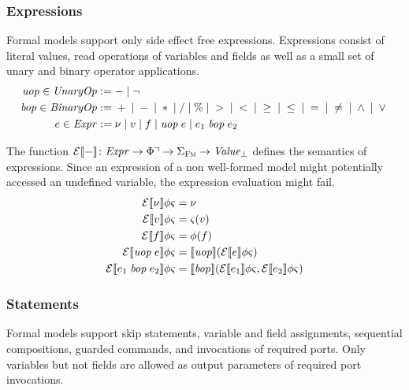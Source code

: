 \documentclass[a4paper,10pt,english]{article}
\begin{document}
\subsubsection{Expressions}
Formal models support only side effect free expressions. Expressions consist of literal values, read operations of variables
and fields as well as a small set of unary and binary operator applications.
\begin{align*}
	\mathit{uop} \in \mathit{UnaryOp} & := - \mid \neg
	\\
    \mathit{bop} \in \mathit{BinaryOp} & := {} + {} \mid {} - {} \mid {} \ast {} \mid {} / {}
                       \mid {} \% {} \mid {} > {} \mid {} < {} \mid {} \geq {} 
                       \mid {} \leq {} \mid {} = {} \mid {} \neq {} \mid {} \wedge {} \mid {} \vee {}
	\\
	e \in \mathit{Expr} & := 
		\nu \mid
		v \mid
		f \mid 
		\mathit{uop}\; e \mid
		e_1 \;\mathit{bop}\; e_2
\end{align*}

The function $\mathcal{E} \llbracket - \rrbracket \colon \mathit{Expr} \rightarrow \Phi\urcorner \rightarrow \Sigma_\textsc{Fm} \rightarrow \mathit{Value}_\bot$ defines the
semantics of expressions. Since an expression of a non well-formed model might potentially accessed an undefined variable, the expression
evaluation might fail. 
\begin{align*}
	\mathcal{E} \llbracket \nu \rrbracket \phi \varsigma &= \nu \\
	\mathcal{E} \llbracket v \rrbracket \phi \varsigma &= \varsigma(v) \\
	\mathcal{E} \llbracket f \rrbracket \phi \varsigma &= \phi(f) \\
	\mathcal{E} \llbracket \mathit{uop}\; e \rrbracket \phi \varsigma &= \llbracket \mathit{uop} \rrbracket (\mathcal{E} \llbracket e \rrbracket \phi
	\varsigma) \\
	\mathcal{E} \llbracket e_1 \;\mathit{bop}\; e_2 \rrbracket \phi \varsigma &= \llbracket \mathit{bop} \rrbracket
	(\mathcal{E} \llbracket e_1 \rrbracket \phi \varsigma, \mathcal{E} \llbracket e_2 \rrbracket \phi \varsigma)
\end{align*}

\subsubsection{Statements}
Formal models support skip statements, variable and field assignments, sequential compositions, guarded commands, and
invocations of required ports. Only variables but not fields are allowed as output parameters of required port invocations.
\end{document}
